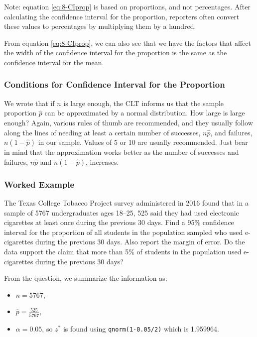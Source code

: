 \documentclass[
]{book}
\providecommand{\tightlist}{%
  \setlength{\itemsep}{0pt}\setlength{\parskip}{0pt}}
\begin{document}
Note: equation \eqref{eq:8-CIprop} is based on proportions, and not percentages. After calculating the confidence interval for the proportion, reporters often convert these values to percentages by multiplying them by a hundred.

From equation \eqref{eq:8-CIprop}, we can also see that we have the factors that affect the width of the confidence interval for the proportion is the same as the confidence interval for the mean.

\subsubsection{Conditions for Confidence Interval for the Proportion}\label{conditions-for-confidence-interval-for-the-proportion}

We wrote that if \(n\) is large enough, the CLT informs us that the sample proportion \(\hat{p}\) can be approximated by a normal distribution. How large is large enough? Again, various rules of thumb are recommended, and they usually follow along the lines of needing at least a certain number of successes, \(n\hat{p}\), and failures, \(n(1-\hat{p})\) in our sample. Values of 5 or 10 are usually recommended. Just bear in mind that the approximation works better as the number of successes and failures, \(n\hat{p}\) and \(n(1-\hat{p})\), increases.

\subsubsection{Worked Example}\label{worked-example-3}

The Texas College Tobacco Project survey administered in 2016 found that in a sample of 5767 undergraduates ages 18--25, 525 said they had used electronic cigarettes at least once during the previous 30 days. Find a 95\% confidence interval for the proportion of all students in the population sampled who used e-cigarettes during the previous 30 days. Also report the margin of error. Do the data support the claim that more than 5\% of students in the population used e-cigarettes during the previous 30 days?

From the question, we summarize the information as:

\begin{itemize}
\tightlist
\item
  \(n = 5767\),
\item
  \(\hat{p} = \frac{525}{5767}\),
\item
  \(\alpha = 0.05\), so \(z^*\) is found using \texttt{qnorm(1-0.05/2)} which is 1.959964.
\end{itemize}
\end{document}
